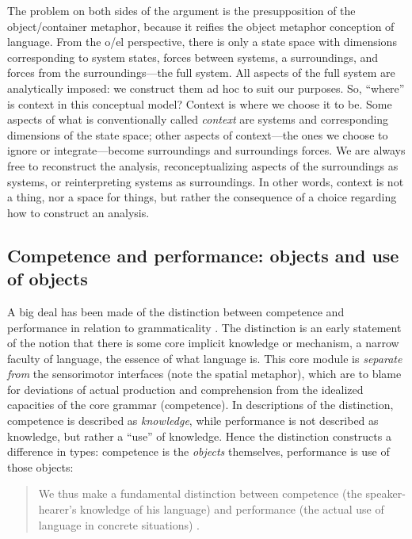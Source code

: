   The problem on both sides of the argument is the presupposition of the object/container metaphor, because it reifies the object metaphor conception of language. From the o/el perspective, there is only a state space with dimensions corresponding to system states, forces between systems, a surroundings, and forces from the surroundings—the full system. All aspects of the full system are analytically imposed: we construct them ad hoc to suit our purposes. So, “where” is context in this conceptual model? Context is where we choose it to be. Some aspects of what is conventionally called \textit{context} are systems and corresponding dimensions of the state space; other aspects of context—the ones we choose to ignore or integrate—become surroundings and surroundings forces. We are always free to reconstruct the analysis, reconceptualizing aspects of the surroundings as systems, or reinterpreting systems as surroundings. In other words, context is not a thing, nor a space for things, but rather the consequence of a choice regarding how to construct an analysis.

\subsection{Competence and performance: objects and use of objects}

A big deal has been made of the distinction between competence and performance in relation to grammaticality \citep{Chomsky1965}. The distinction is an early statement of the notion that there is some core implicit knowledge or mechanism, a narrow faculty of language, the essence of what language is. This core module is \textit{separate from} the sensorimotor interfaces (note the spatial metaphor), which are to blame for deviations of actual production and comprehension from the idealized capacities of the core grammar (competence). In descriptions of the distinction, competence is described as \textit{knowledge}, while performance is not described as knowledge, but rather a “use” of knowledge. Hence the distinction constructs a difference in types: competence is the \textit{objects} themselves, performance is use of those objects:

\begin{quote}
We thus make a fundamental distinction between competence (the speaker-hearer's knowledge of his language) and performance (the actual use of language in concrete situations) \citep[4]{Chomsky1965}.
\end{quote}


